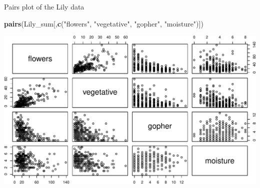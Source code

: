 \documentclass[
  ignorenonframetext,
]{beamer}
\newenvironment{Shaded}{\begin{snugshade}}{\end{snugshade}}
\newcommand{\KeywordTok}[1]{\textcolor[rgb]{0.13,0.29,0.53}{\textbf{#1}}}
\newcommand{\NormalTok}[1]{#1}
\newcommand{\StringTok}[1]{\textcolor[rgb]{0.31,0.60,0.02}{#1}}
\begin{document}
\begin{frame}[fragile]{Pairs plot of the Lily data}
\protect\hypertarget{pairs-plot-of-the-lily-data}{}

\scriptsize

\begin{Shaded}
\begin{Highlighting}[]
\KeywordTok{pairs}\NormalTok{(Lily_sum[,}\KeywordTok{c}\NormalTok{(}\StringTok{"flowers"}\NormalTok{, }\StringTok{"vegetative"}\NormalTok{, }\StringTok{"gopher"}\NormalTok{, }\StringTok{"moisture"}\NormalTok{)])}
\end{Highlighting}
\end{Shaded}

\includegraphics{Regression_and_ANOVA_files/figure-beamer/unnamed-chunk-9-1.pdf}

\end{frame}
\end{document}
